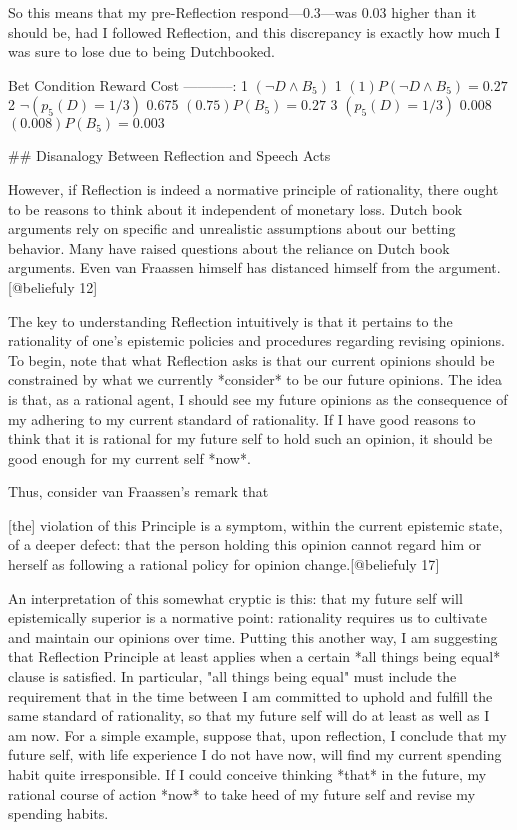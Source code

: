 So this means that my pre-Reflection respond---\(0.3\)---was \(0.03\)
higher than it should be, had I followed Reflection, and this
discrepancy is exactly how much I was sure to lose due to being
Dutchbooked.

\textbar{} Bet \textbar{}Condition \textbar{}Reward \textbar{} Cost
\textbar{}
\textbar{}---\textbar{}---\textbar{}---\textbar{}--:\textbar{}
\textbar{} 1 \textbar{} \((\neg D \wedge B_5)\) \textbar{} 1 \textbar{}
\((1)P(\neg D \wedge B_5) =0.27\) \textbar{} \textbar{} 2 \textbar{}
\(\neg (p_{5}(D) = 1/3)\)\textbar{} 0.675 \textbar{}
\((0.75)P(B_5)=0.27\) \textbar{} \textbar{} 3 \textbar{}
\((p_{5} (D)= 1/3)\) \textbar{} 0.008 \textbar{}
\((0.008)P(B_5) = 0.003\) \textbar{}

\#\# Disanalogy Between Reflection and Speech Acts

However, if Reflection is indeed a normative principle of rationality,
there ought to be reasons to think about it independent of monetary
loss. Dutch book arguments rely on specific and unrealistic assumptions
about our betting behavior. Many have raised questions about the
reliance on Dutch book arguments. Even van Fraassen himself has
distanced himself from the argument.{[}@beliefuly 12{]}

The key to understanding Reflection intuitively is that it pertains to
the rationality of one's epistemic policies and procedures regarding
revising opinions. To begin, note that what Reflection asks is that our
current opinions should be constrained by what we currently *consider*
to be our future opinions. The idea is that, as a rational agent, I
should see my future opinions as the consequence of my adhering to my
current standard of rationality. If I have good reasons to think that it
is rational for my future self to hold such an opinion, it should be
good enough for my current self *now*.

Thus, consider van Fraassen's remark that

{[}the{]} violation of this Principle is a symptom, within the current
epistemic state, of a deeper defect: that the person holding this
opinion cannot regard him or herself as following a rational policy for
opinion change.{[}@beliefuly 17{]}

An interpretation of this somewhat cryptic is this: that my future self
will epistemically superior is a normative point: rationality requires
us to cultivate and maintain our opinions over time. Putting this
another way, I am suggesting that Reflection Principle at least applies
when a certain *all things being equal* clause is satisfied. In
particular, "all things being equal" must include the requirement that
in the time between I am committed to uphold and fulfill the same
standard of rationality, so that my future self will do at least as well
as I am now. For a simple example, suppose that, upon reflection, I
conclude that my future self, with life experience I do not have now,
will find my current spending habit quite irresponsible. If I could
conceive thinking *that* in the future, my rational course of action
*now* to take heed of my future self and revise my spending habits.


